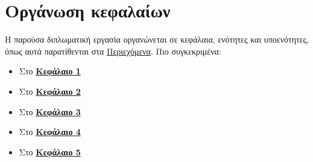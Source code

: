 \section{Οργάνωση κεφαλαίων}

Η παρούσα διπλωματική εργασία οργανώνεται σε κεφάλαια, ενότητες και υποενότητες, όπως αυτά παρατίθενται στα \hyperref[toc]{Περιεχόμενα}. Πιο συγκεκριμένα:

\begin{itemize}
	\item Στο \hyperref[chapter:1-introduction]{\textbf{Κεφάλαιο 1}}
	\item Στο \hyperref[chapter:2-theoretical-background]{\textbf{Κεφάλαιο 2}}
	\item Στο \hyperref[chapter:3-application-design]{\textbf{Κεφάλαιο 3}}
	\item Στο \hyperref[chapter:4-application-implementation]{\textbf{Κεφάλαιο 4}}
	\item Στο \hyperref[chapter:5-conclusions]{\textbf{Κεφάλαιο 5}}
\end{itemize}